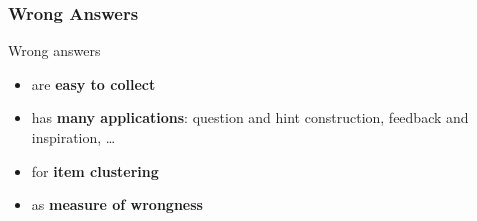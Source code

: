 \documentclass[xcolor=svgnames]{beamer}
\begin{document}
\begin{frame}
    \frametitle{Wrong Answers}
    \huge
    Wrong answers
    \Large
    \begin{itemize}
        \item are \textbf{easy to collect}
        \item has \textbf{many applications}: question and hint construction, feedback and inspiration, \dots
        \item for \textbf{item clustering}
        \item as \textbf{measure of wrongness}
    \end{itemize}
\end{frame}
\end{document}
